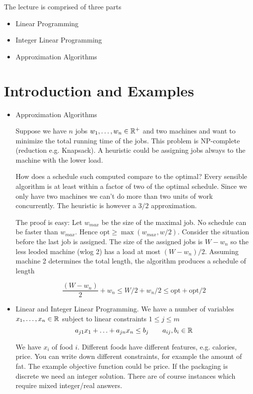 The lecture is comprised of three parts

\begin{itemize}
\item Linear Programming
\item Integer Linear Programming
\item Approximation Algorithms
\end{itemize}

\section{Introduction and Examples}
\begin{itemize}
\item Approximation Algorithms
\begin{Ex} Suppose we have $n$ jobs ${w}_1,\ldots,{w}_n\in \mathbb{R}^+$ and two machines and want to minimize the total running time of the jobs. This problem is NP-complete (reduction e.g. Knapsack). A heuristic could be assigning jobs always to the machine with the lower load.

How does a schedule such computed compare to the optimal? Every sensible algorithm is at least within a factor of two of the optimal schedule. Since we only have two machines we can't do more than two units of work concurrently. The heuristic is however a $3/2$ approximation.

The proof is easy: Let $w_{max}$ be the size of the maximal job. No schedule can be faster than $w_{max}$. Hence $\mbox{opt} \geq \max (w_{max}, w/2)$. Consider the situation before the last job is assigned. The size of the assigned jobs is $W-w_n$ so the less leoded machine (wlog 2) has a load at most $(W-w_n)/2$. Assuming machine 2 determines the total length, the algorithm produces a schedule of length 

\[\frac{(W-w_n)}{2} + w_n \leq W/2+w_n/2 \leq \mbox{opt} + \mbox{opt}/2\]
\end{Ex}
\item Linear and Integer Linear Programming. We have a number of variables ${x}_1,\ldots,{x}_n\in \mathbb{R}$ subject to linear constraints $1\leq j\leq m$
\[a_{j1}x_1 + \ldots + a_{jn} x_n \leq b_j \qquad a_{ij},b_i \in \mathbb{R}\]

\begin{Ex} We have $x_i$ of food $i$. Different foods have different features, e.g. calories, price. You can write down different constraints, for example the amount of fat. The example objective function could be price. If the packaging is discrete we need an integer solution. There are of course instances which require mixed integer/real answers.
\end{Ex}


\end{itemize}
